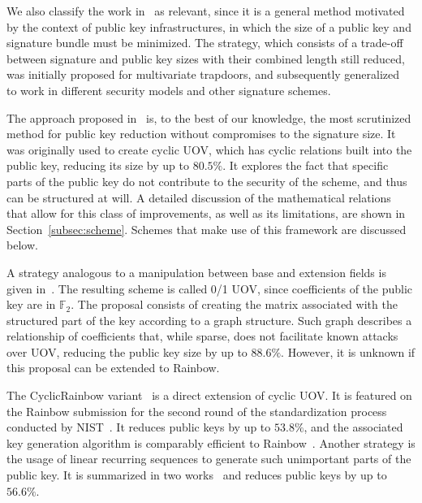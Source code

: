 \documentclass[draft, 12pt, a4paper, oneside]{memoir}
\theoremstyle{definition}
\begin{document}
We also classify the work in~\cite{Szepieniec:201706} as relevant, since it is a general method motivated by the context of public key infrastructures, in which the size of a public key and signature bundle must be minimized. The strategy, which consists of a trade-off between signature and public key sizes with their combined length still reduced, was initially proposed for multivariate trapdoors, and subsequently generalized~\cite{Beullens:201808} to work in different security models and other signature schemes.

The approach proposed in~\cite{Petzoldt:201006} is, to the best of our knowledge, the most scrutinized method for public key reduction without compromises to the signature size. It was originally used to create cyclic UOV, which has cyclic relations built into the public key, reducing its size by up to $80.5\%$. It explores the fact that specific parts of the public key do not contribute to the security of the scheme, and thus can be structured at will. A detailed discussion of the mathematical relations that allow for this class of improvements, as well as its limitations, are shown in Section~\ref{subsec:scheme}. Schemes that make use of this framework are discussed below. 


A strategy analogous to a manipulation between base and extension fields is given in~\cite{Petzoldt:201109}. The resulting scheme is called 0/1 UOV, since coefficients of the public key are in $\mathbb{F}_{2}$. The proposal consists of creating the matrix associated with the structured part of the key according to a graph structure. Such graph describes a relationship of coefficients that, while sparse, does not facilitate known attacks over UOV, reducing the public key size by up to $88.6\%$. However, it is unknown if this proposal can be extended to Rainbow.

The CyclicRainbow variant~\cite{Petzoldt:201012} is a direct extension of cyclic UOV. It is featured on the Rainbow submission for the second round of the standardization process conducted by NIST~\cite{Ding:201901}. It reduces public keys by up to $53.8\%$, and the associated key generation algorithm is comparably efficient to Rainbow~\cite{Petzoldt:202004}. Another strategy is the usage of linear recurring sequences to generate such unimportant parts of the public key. It is summarized in two works~\cite{Petzoldt:201103,Petzoldt:201211} and reduces public keys by up to $56.6\%$.
\end{document}
